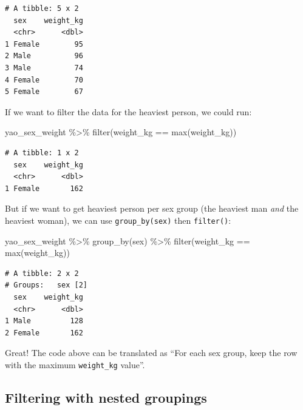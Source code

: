 \documentclass[
  letterpaper,
  DIV=11,
  numbers=noendperiod]{scrreprt}
\newenvironment{Shaded}{\begin{snugshade}}{\end{snugshade}}
\newcommand{\FunctionTok}[1]{\textcolor[rgb]{0.28,0.35,0.67}{#1}}
\newcommand{\NormalTok}[1]{\textcolor[rgb]{0.00,0.23,0.31}{#1}}
\newcommand{\SpecialCharTok}[1]{\textcolor[rgb]{0.37,0.37,0.37}{#1}}
\begin{document}
\begin{verbatim}
# A tibble: 5 x 2
  sex    weight_kg
  <chr>      <dbl>
1 Female        95
2 Male          96
3 Male          74
4 Female        70
5 Female        67
\end{verbatim}

If we want to filter the data for the heaviest person, we could run:

\begin{Shaded}
\begin{Highlighting}[]
\NormalTok{yao\_sex\_weight }\SpecialCharTok{\%\textgreater{}\%} 
  \FunctionTok{filter}\NormalTok{(weight\_kg }\SpecialCharTok{==} \FunctionTok{max}\NormalTok{(weight\_kg))}
\end{Highlighting}
\end{Shaded}

\begin{verbatim}
# A tibble: 1 x 2
  sex    weight_kg
  <chr>      <dbl>
1 Female       162
\end{verbatim}

But if we want to get heaviest person per sex group (the heaviest man
\emph{and} the heaviest woman), we can use \texttt{group\_by(sex)} then
\texttt{filter()}:

\begin{Shaded}
\begin{Highlighting}[]
\NormalTok{yao\_sex\_weight }\SpecialCharTok{\%\textgreater{}\%} 
  \FunctionTok{group\_by}\NormalTok{(sex) }\SpecialCharTok{\%\textgreater{}\%} 
  \FunctionTok{filter}\NormalTok{(weight\_kg }\SpecialCharTok{==} \FunctionTok{max}\NormalTok{(weight\_kg))}
\end{Highlighting}
\end{Shaded}

\begin{verbatim}
# A tibble: 2 x 2
# Groups:   sex [2]
  sex    weight_kg
  <chr>      <dbl>
1 Male         128
2 Female       162
\end{verbatim}

Great! The code above can be translated as ``For each sex group, keep
the row with the maximum \texttt{weight\_kg} value''.

\hypertarget{filtering-with-nested-groupings}{%
\subsection*{Filtering with nested
groupings}\label{filtering-with-nested-groupings}}
\end{document}
